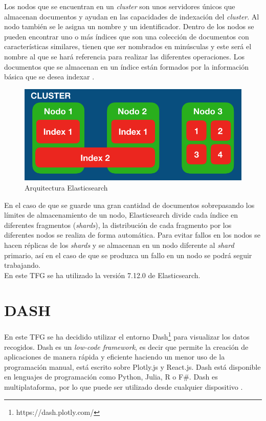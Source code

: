 Los nodos que se encuentran en un \textit{cluster} son unos servidores únicos que almacenan documentos y ayudan en las capacidades de indexación del \textit{cluster}. Al nodo también se le asigna un nombre y un identificador. Dentro de los nodos se pueden encontrar uno o más índices que son una colección de documentos con características similares, tienen que ser nombrados en minúsculas y este será el nombre al que se hará referencia para realizar las diferentes operaciones. Los documentos que se almacenan en un índice están formados por la información básica que se desea indexar \cite{elastic3}.\\



\begin{figure}[H]
    \centering
    \includegraphics[width=12cm, keepaspectratio]{img/arquitectura_elastic.png}
    \caption{Arquitectura Elasticsearch}
    \label{fig:elastic}
\end{figure}
En el caso de que se guarde una gran cantidad de documentos sobrepasando los límites de almacenamiento de un nodo, Elasticsearch divide cada índice en diferentes fragmentos (\textit{shards}), la distribución de cada fragmento por los diferentes nodos se realiza de forma automática. Para evitar fallos en los nodos se hacen réplicas de los \textit{shards} y se almacenan en un nodo diferente al \textit{shard} primario, así en el caso de que se produzca un fallo en un nodo se podrá seguir trabajando.\\

En este TFG se ha utilizado la versión 7.12.0 de Elasticsearch.


\section{DASH}

En este TFG se ha decidido utilizar el entorno Dash\footnote{https://dash.plotly.com/} para visualizar los datos recogidos. Dash es un \textit{low-code framework}, es decir que permite la creación de aplicaciones de manera rápida y eficiente haciendo un menor uso de la programación manual, está escrito sobre Plotly.js y React.js. Dash está disponible en lenguajes de programación como Python, Julia, R o F#. Dash es multiplataforma, por lo que puede ser utilizado desde cualquier dispositivo \cite{dash}.\\

